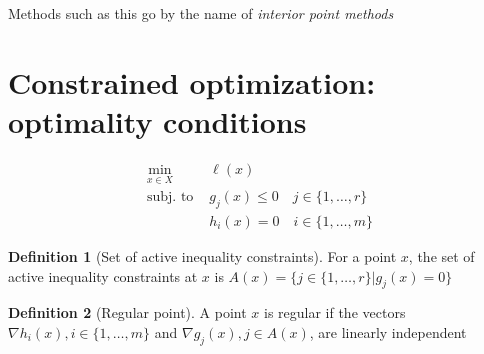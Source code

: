 \documentclass[openany]{book}
\theoremstyle{definition}
\newtheorem{definition}{Definition}[section] %
\theoremstyle{remark}
\begin{document}
Methods such as this go by the name of \emph{interior point methods}

\section{Constrained optimization: optimality conditions}

\begin{align*}
    \min_{x\in X}\  &\ell(x)\\
    \text{subj. to } & g_j(x)\leq 0 \quad j\in\{1,\dots,r\}\\
    & h_i(x)=0 \quad i\in\{1,\dots,m\}
\end{align*}

\begin{definition}[Set of active inequality constraints]
    For a point $x$, the set of active inequality constraints at $x$ is $A(x) = \{j\in\{1,\dots,r\}|g_j(x)=0\}$
\end{definition}
\begin{definition}[Regular point]
    A point $x$ is regular if the vectors $\nabla h_i(x), i\in \{1,\dots,m\}$ and $\nabla g_j(x), j\in A(x)$, are linearly independent
\end{definition}
\end{document}
